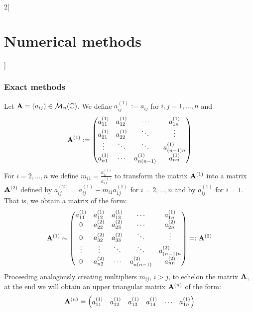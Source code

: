 \documentclass[../../../main.tex]{subfiles}
\begin{document}
\begin{multicols}{2}[\section{Numerical methods}]
    \subsubsection*{Exact methods}
    \begin{method}
        Let $\mathblack{A}=(a_{ij})\in\mathcal{M}_n(\CC)$. We define $a_{ij}^{(1)}:=a_{ij}$ for $i,j=1,\ldots,n$ and
        $$\mathblack{A}^{(1)}:=
            \begin{pmatrix}
                a_{11}^{(1)} & a_{12}^{(1)} & \cdots           & a_{1n}^{(1)}     \\
                a_{21}^{(1)} & a_{22}^{(1)} & \ddots           & \vdots           \\
                \vdots       & \ddots       & \ddots           & a_{(n-1)n}^{(1)} \\
                a_{n1}^{(1)} & \cdots       & a_{n(n-1)}^{(1)} & a_{nn}^{(1)}
            \end{pmatrix}
        $$
        For $i=2,\ldots,n$ we define $m_{i1}=\frac{a_{i1}^{(1)}}{a_{11}^{(1)}}$ to transform the matrix $\mathblack{A}^{(1)}$ into a matrix $\mathblack{A}^{(2)}$ defined by $a_{ij}^{(2)}=a_{ij}^{(1)}-m_{i1}a_{1j}^{(1)}$ for $i=2,\ldots,n$ and by $a_{ij}^{(1)}$ for $i=1$. That is, we obtain a matrix of the form:
        $$\mathblack{A}^{(1)}\sim
            \begin{pmatrix}
                a_{11}^{(1)} & a_{12}^{(1)} & a_{13}^{(1)} & \cdots           & a_{1n}^{(1)}     \\
                0            & a_{22}^{(2)} & a_{23}^{(2)} & \cdots           & a_{2n}^{(2)}     \\
                0            & a_{32}^{(2)} & a_{33}^{(2)} & \ddots           & \vdots           \\
                \vdots       & \vdots       & \ddots       & \ddots           & a_{(n-1)n}^{(2)} \\
                0            & a_{n2}^{(2)} & \cdots       & a_{n(n-1)}^{(2)} & a_{nn}^{(2)}
            \end{pmatrix} =:\mathblack{A}^{(2)}
        $$
        Proceeding analogously creating multipliers $m_{ij}$, $i>j$, to echelon the matrix $\mathblack{A}$, at the end we will obtain an upper triangular matrix $\mathblack{A}^{(n)}$ of the form:
        $$\mathblack{A}^{(n)}=
            \begin{pmatrix}
                a_{11}^{(1)} & a_{12}^{(1)} & a_{13}^{(1)} & a_{14}^{(1)} & \cdots                 & a_{1n}^{(1)}       \\

\end{pmatrix}$$
\end{method}
\end{multicols}
\end{document}
